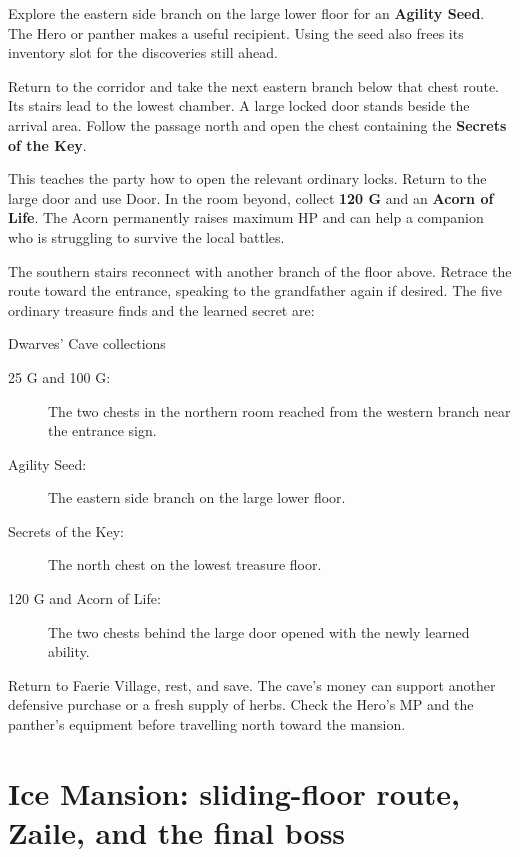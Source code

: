 Explore the eastern side branch on the large lower floor for an
\textbf{Agility Seed}. The Hero or panther makes a useful recipient.
Using the seed also frees its inventory slot for the discoveries still
ahead.

Return to the corridor and take the next eastern branch below that
chest route. Its stairs lead to the lowest chamber. A large locked door
stands beside the arrival area. Follow the passage north and open the
chest containing the \textbf{Secrets of the Key}.


This teaches the party how to open the relevant ordinary locks. Return
to the large door and use Door. In the room beyond, collect
\textbf{120 G} and an \textbf{Acorn of Life}. The Acorn permanently
raises maximum HP and can help a companion who is struggling to survive
the local battles.

The southern stairs reconnect with another branch of the floor above.
Retrace the route toward the entrance, speaking to the grandfather again
if desired. The five ordinary treasure finds and the learned secret are:
\begin{routecheck}{Dwarves' Cave collections}
\begin{description}
  \item[25 G and 100 G:] The two chests in the northern room reached
    from the western branch near the entrance sign.
  \item[Agility Seed:] The eastern side branch on the large lower floor.
  \item[Secrets of the Key:] The north chest on the lowest treasure floor.
  \item[120 G and Acorn of Life:] The two chests behind the large door
    opened with the newly learned ability.
\end{description}
\end{routecheck}

Return to Faerie Village, rest, and save. The cave's money can support
another defensive purchase or a fresh supply of herbs. Check the Hero's
MP and the panther's equipment before travelling north toward the mansion.

\section{Ice Mansion: sliding-floor route, Zaile, and the final boss}

